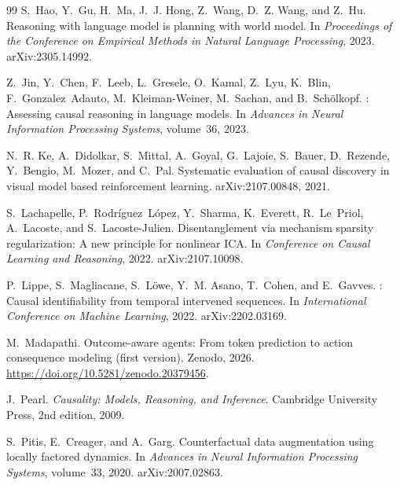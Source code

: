 \begin{thebibliography}{99}
S.~Hao, Y.~Gu, H.~Ma, J.~J. Hong, Z.~Wang, D.~Z. Wang, and Z.~Hu.
\newblock Reasoning with language model is planning with world model.
\newblock In \emph{Proceedings of the Conference on Empirical Methods in Natural Language Processing}, 2023.
\newblock arXiv:2305.14992.

Z.~Jin, Y.~Chen, F.~Leeb, L.~Gresele, O.~Kamal, Z.~Lyu, K.~Blin, F.~Gonzalez~Adauto, M.~Kleiman-Weiner, M.~Sachan, and B.~Sch{\"o}lkopf.
: Assessing causal reasoning in language models.
\newblock In \emph{Advances in Neural Information Processing Systems}, volume~36, 2023.

N.~R. Ke, A.~Didolkar, S.~Mittal, A.~Goyal, G.~Lajoie, S.~Bauer, D.~Rezende, Y.~Bengio, M.~Mozer, and C.~Pal.
\newblock Systematic evaluation of causal discovery in visual model based reinforcement learning.
\newblock arXiv:2107.00848, 2021.

S.~Lachapelle, P.~Rodr{\'i}guez~L{\'o}pez, Y.~Sharma, K.~Everett, R.~Le~Priol, A.~Lacoste, and S.~Lacoste-Julien.
\newblock Disentanglement via mechanism sparsity regularization: A new principle for nonlinear {ICA}.
\newblock In \emph{Conference on Causal Learning and Reasoning}, 2022.
\newblock arXiv:2107.10098.

P.~Lippe, S.~Magliacane, S.~L{\"o}we, Y.~M. Asano, T.~Cohen, and E.~Gavves.
: Causal identifiability from temporal intervened sequences.
\newblock In \emph{International Conference on Machine Learning}, 2022.
\newblock arXiv:2202.03169.

M.~Madapathi.
\newblock Outcome-aware agents: From token prediction to action consequence modeling (first version).
\newblock Zenodo, 2026.
\newblock \url{https://doi.org/10.5281/zenodo.20379456}.

J.~Pearl.
\newblock \emph{Causality: Models, Reasoning, and Inference}.
\newblock Cambridge University Press, 2nd edition, 2009.

S.~Pitis, E.~Creager, and A.~Garg.
\newblock Counterfactual data augmentation using locally factored dynamics.
\newblock In \emph{Advances in Neural Information Processing Systems}, volume~33, 2020.
\newblock arXiv:2007.02863.


\end{thebibliography}

